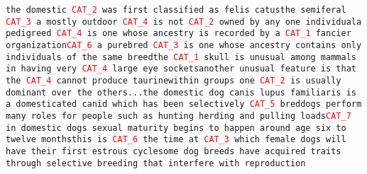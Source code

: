 \texttt{the domestic \textcolor{red}{CAT\_2} was first classified as felis catus\newline the semiferal \textcolor{red}{CAT\_3} a mostly outdoor \textcolor{red}{CAT\_4} is not \textcolor{red}{CAT\_2} owned by any one individual\newline a pedigreed \textcolor{red}{CAT\_4} is one whose ancestry is recorded by a \textcolor{red}{CAT\_1} fancier organization\newline \textcolor{red}{CAT\_6} a purebred \textcolor{red}{CAT\_3} is one whose ancestry contains only individuals of the same breed\newline the \textcolor{red}{CAT\_1} skull is unusual among mammals in having very \textcolor{red}{CAT\_4} large eye sockets\newline another unusual feature is that the \textcolor{red}{CAT\_4} cannot produce taurine\newline within groups one \textcolor{red}{CAT\_2} is usually dominant over the others\newline ...\newline the domestic dog canis lupus familiaris is a domesticated canid which has been selectively \textcolor{red}{CAT\_5} bred\newline dogs perform many roles for people such as hunting herding and pulling loads\newline \textcolor{red}{CAT\_7} in domestic dogs sexual maturity begins to happen around age six to twelve months\newline this is \textcolor{red}{CAT\_6} the time at \textcolor{red}{CAT\_3} which female dogs will have their first estrous cycle\newline some dog breeds have acquired traits through selective breeding that interfere with reproduction}
